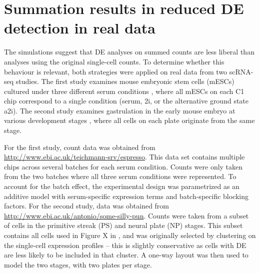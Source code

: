 \documentclass{article}
\begin{document}
\section{Summation results in reduced DE detection in real data}
The simulations suggest that DE analyses on summed counts are less liberal than analyses using the original single-cell counts.
To determine whether this behaviour is relevant, both strategies were applied on real data from two scRNA-seq studies.
The first study examines mouse embryonic stem cells (mESCs) cultured under three different serum conditions \cite{kolod2015single},
    where all mESCs on each C1 chip correspond to a single condition (serum, 2i, or the alternative ground state a2i).
The second study examines gastrulation in the early mouse embryo at various development stages \cite{scialdone2015single},
    where all cells on each plate originate from the same stage.

For the first study, count data was obtained from \url{http://www.ebi.ac.uk/teichmann-srv/espresso}. 
This data set contains multiple chips across several batches for each serum condition.
Counts were only taken from the two batches where all three serum conditions were represented.
To account for the batch effect, the experimental design was parametrized as an additive model with serum-specific expression terms and batch-specific blocking factors.
For the second study, data was obtained from \url{http://www.ebi.ac.uk/antonio/some-silly-pun}.
Counts were taken from a subset of cells in the primitive streak (PS) and neural plate (NP) stages.
This subset contains all cells used in Figure X in \cite{scialdone2015single}, and was originally selected by clustering on the single-cell expression profiles 
    -- this is slightly conservative as cells with DE are less likely to be included in that cluster.
A one-way layout was then used to model the two stages, with two plates per stage.

\end{document}

